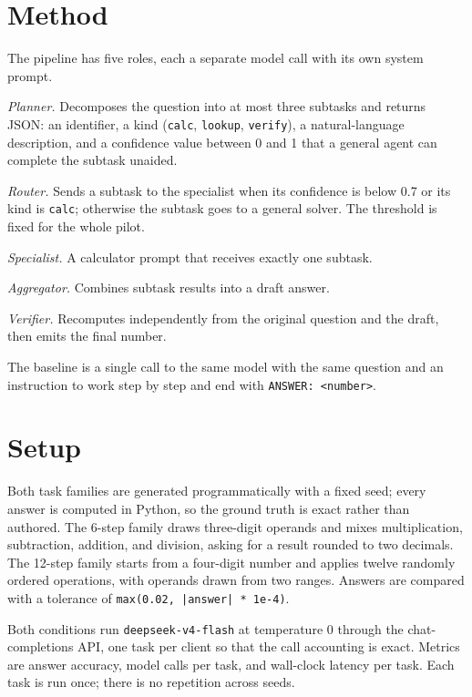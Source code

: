 \documentclass[runningheads,a4paper]{llncs}
\begin{document}
\section{Method}

The pipeline has five roles, each a separate model call with its own system prompt.

\emph{Planner.} Decomposes the question into at most three subtasks and returns JSON: an identifier, a kind (\texttt{calc}, \texttt{lookup}, \texttt{verify}), a natural-language description, and a confidence value between 0 and 1 that a general agent can complete the subtask unaided.

\emph{Router.} Sends a subtask to the specialist when its confidence is below 0.7 or its kind is \texttt{calc}; otherwise the subtask goes to a general solver. The threshold is fixed for the whole pilot.

\emph{Specialist.} A calculator prompt that receives exactly one subtask.

\emph{Aggregator.} Combines subtask results into a draft answer.

\emph{Verifier.} Recomputes independently from the original question and the draft, then emits the final number.

The baseline is a single call to the same model with the same question and an instruction to work step by step and end with \texttt{ANSWER: <number>}.

\section{Setup}

Both task families are generated programmatically with a fixed seed; every answer is computed in Python, so the ground truth is exact rather than authored. The 6-step family draws three-digit operands and mixes multiplication, subtraction, addition, and division, asking for a result rounded to two decimals. The 12-step family starts from a four-digit number and applies twelve randomly ordered operations, with operands drawn from two ranges. Answers are compared with a tolerance of \texttt{max(0.02, |answer| * 1e-4)}.

Both conditions run \texttt{deepseek\allowbreak{}-v4-flas\allowbreak{}h} at temperature 0 through the chat-completions API, one task per client so that the call accounting is exact. Metrics are answer accuracy, model calls per task, and wall-clock latency per task. Each task is run once; there is no repetition across seeds.
\end{document}
